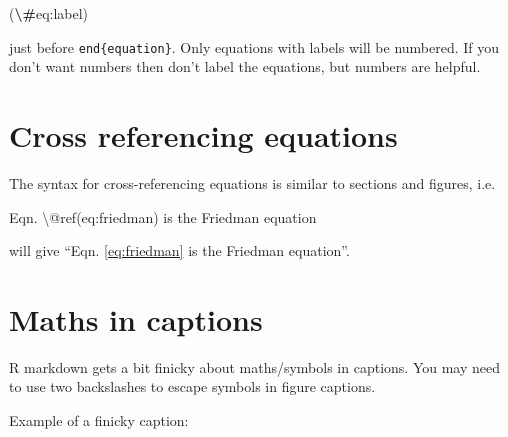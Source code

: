 \documentclass[
]{book}
\newenvironment{Shaded}{\begin{snugshade}}{\end{snugshade}}
\newcommand{\NormalTok}[1]{#1}
\newcommand{\SpecialCharTok}[1]{\textcolor[rgb]{0.81,0.36,0.00}{\textbf{#1}}}
\begin{document}
\begin{Shaded}
\begin{Highlighting}[]
\NormalTok{(}\SpecialCharTok{\textbackslash{}\#}\NormalTok{eq:label)}
\end{Highlighting}
\end{Shaded}

just before \texttt{end\{equation\}}. Only equations with labels will be numbered. If you don't want numbers then don't label the equations, but numbers are helpful.

\section{Cross referencing equations}\label{sec:cross-ref-eqs}

The syntax for cross-referencing equations is similar to sections and figures, i.e.

\begin{Shaded}
\begin{Highlighting}[]
\NormalTok{Eqn. \textbackslash{}@ref(eq:friedman) is the Friedman equation}
\end{Highlighting}
\end{Shaded}

will give ``Eqn. \eqref{eq:friedman} is the Friedman equation''.

\section{Maths in captions}\label{sec:maths-captions}

R markdown gets a bit finicky about maths/symbols in captions. You may need to use two backslashes to escape symbols in figure captions.

Example of a finicky caption:
\end{document}
